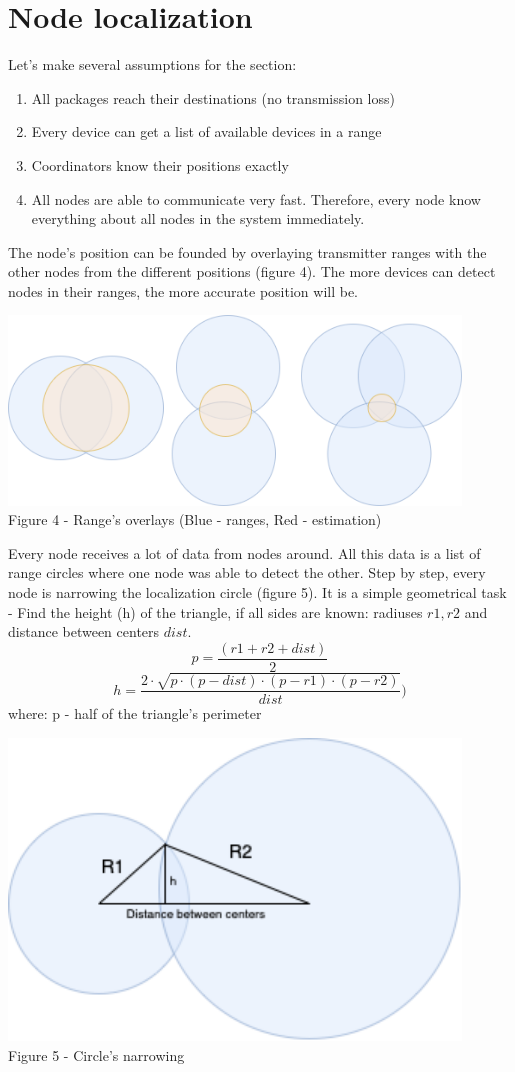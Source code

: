 \documentclass[12pt,a4paper]{report}
\begin{document}
\section*{Node localization}
Let's make several assumptions for the section:
\begin{enumerate}
    \item All packages reach their destinations (no transmission loss)
    \item Every device can get a list of available devices in a range
    \item Coordinators know their positions exactly
    \item All nodes are able to communicate very fast. Therefore, every node know everything about all nodes in the system immediately.
\end{enumerate}
The node's position can be founded by overlaying transmitter ranges with the other nodes from the different positions (figure 4). The more devices can detect nodes in their ranges, the more accurate position will be.
\begin{center}
    \includegraphics[width=12cm]{img/areas.png}\\
    Figure 4 - Range's overlays (Blue - ranges, Red - estimation)
\end{center}
Every node receives a lot of data from nodes around. All this data is a list of range circles where one node was able to detect the other. Step by step, every node is narrowing the localization circle (figure 5). It is a simple geometrical task - Find the height (h) of the triangle, if all sides are known: radiuses $r1, r2$ and distance between centers $dist$.
\[ p = \frac{(r1+r2+dist)}{2}\]
\[ h = \frac{2\cdot\sqrt{p\cdot(p-dist)\cdot(p-r1)\cdot(p-r2)}}{dist})\]
where: p - half of the triangle's perimeter 
\begin{center}
    \includegraphics[width=12cm]{img/Geometry.png}\\
    Figure 5 - Circle's narrowing
\end{center}
\end{document}
